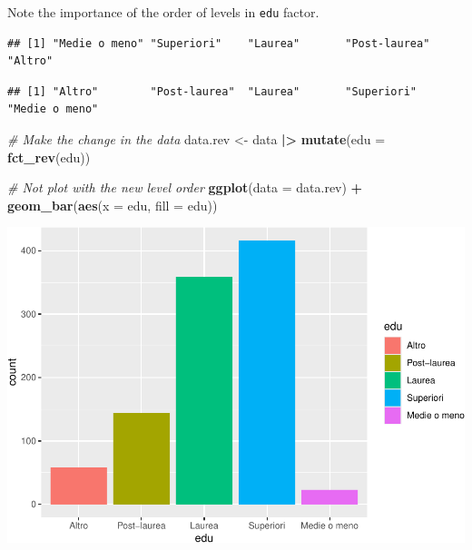\documentclass[
]{book}
\newenvironment{Shaded}{\begin{snugshade}}{\end{snugshade}}
\newcommand{\AttributeTok}[1]{\textcolor[rgb]{0.13,0.29,0.53}{#1}}
\newcommand{\CommentTok}[1]{\textcolor[rgb]{0.56,0.35,0.01}{\textit{#1}}}
\newcommand{\FunctionTok}[1]{\textcolor[rgb]{0.13,0.29,0.53}{\textbf{#1}}}
\newcommand{\NormalTok}[1]{#1}
\newcommand{\OtherTok}[1]{\textcolor[rgb]{0.56,0.35,0.01}{#1}}
\newcommand{\SpecialCharTok}[1]{\textcolor[rgb]{0.81,0.36,0.00}{\textbf{#1}}}
\begin{document}
Note the importance of the order of levels in \texttt{edu} factor.

\begin{Shaded}
\end{Shaded}

\begin{verbatim}
## [1] "Medie o meno" "Superiori"    "Laurea"       "Post-laurea"  "Altro"
\end{verbatim}

\begin{Shaded}
\end{Shaded}

\begin{verbatim}
## [1] "Altro"        "Post-laurea"  "Laurea"       "Superiori"    "Medie o meno"
\end{verbatim}

\begin{Shaded}
\begin{Highlighting}[]
\CommentTok{\# Make the change in the data}
\NormalTok{data.rev }\OtherTok{\textless{}{-}}\NormalTok{ data }\SpecialCharTok{|\textgreater{}} 
  \FunctionTok{mutate}\NormalTok{(}\AttributeTok{edu =} \FunctionTok{fct\_rev}\NormalTok{(edu))}

\CommentTok{\# Not plot with the new level order}
\FunctionTok{ggplot}\NormalTok{(}\AttributeTok{data =}\NormalTok{ data.rev) }\SpecialCharTok{+}
  \FunctionTok{geom\_bar}\NormalTok{(}\FunctionTok{aes}\NormalTok{(}\AttributeTok{x =}\NormalTok{ edu, }\AttributeTok{fill =}\NormalTok{ edu))}
\end{Highlighting}
\end{Shaded}

\includegraphics{R-for-social-research-and-business-analytics_files/figure-latex/unnamed-chunk-27-1.pdf}
\end{document}
